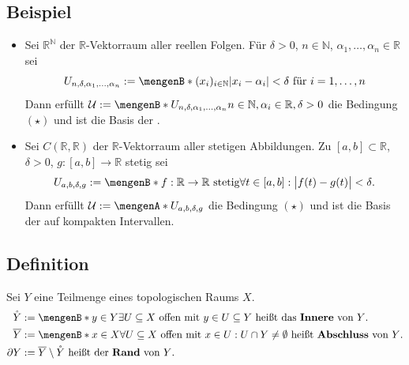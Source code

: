 \subsection[Beispiel: Topologie der punktweisen bzw. gleichmäßigen Konvergenz]{Beispiel} %
\label{sub:118}
\begin{itemize}
	\item Sei $\mathds{R}^\mathds{N}$ der $\mathds{R}$-Vektorraum aller reellen Folgen. Für 
	$\delta >0$, $n \in \mathds{N} $, $\alpha_1, \ldots , \alpha_n \in \mathds{R}$ sei
	\[
		U_{n, \delta , \alpha_1, \ldots , \alpha_n} := \set[(x_i)_{i \in \mathds{N}}]{\abs*{x_i - \alpha_i} < \delta \text{ für } i=1, \ldots ,n } 
	\]
	Dann erfüllt $\mathcal{U} := \set[U_{n, \delta , \alpha_1, \ldots , \alpha_n}]{n \in \mathds{N}, \alpha_i \in \mathds{R}, \delta >0}$ 
	die Bedingung $(\star)$ und ist die Basis der .
	\item Sei $C(\mathds{R},\mathds{R}) $ der $\mathds{R}$-Vektorraum aller stetigen Abbildungen. Zu $[a,b] \subset \mathds{R}$, $\delta >0$, 
	$g : [a,b] \to \mathds{R}$ stetig sei
	\[
		U_{a,b, \delta , g} := \set[f : \mathds{R} \to \mathds{R} \text{ stetig}]{\forall t \in [a,b] : \abs[\big]{f(t)- g(t)}< \delta}. 
	\]
	Dann erfüllt $\mathcal{U} := \set{U_{a,b,\delta ,g}}$ die Bedingung $(\star)$ und ist die Basis der  auf kompakten Intervallen.
\end{itemize}

\subsection[Definition: Inneres, Abschluss und Rand von $Y \subseteq X$]{Definition} %
\label{sub:119}
Sei $Y$ eine Teilmenge eines topologischen Raums $X$.
\begin{align*}
	\mathring Y &:= \set[y \in Y]{ \exists U \subseteq X \text{ offen mit } y \in U \subseteq Y} \text{ heißt das \Index{Innere} von $Y$.} \\ 
	\overline{Y} &:= \set[x \in X]{\forall U \subseteq X \text{ offen mit } x \in U : U \cap Y \not= \emptyset}    \text{ heißt \Index{Abschluss} von $Y$.} \\
	\partial Y &:= \overline{Y} \setminus \mathring Y \text{ heißt der \Index{Rand} von $Y$.} 
\end{align*}

